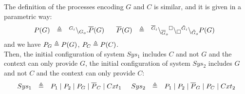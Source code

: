 The definition of the processes encoding $G$ and $C$ is similar, and it is given in a parametric way:
\[
\begin{array}{lcl @{\hspace{0.5cm}}lcl}
P(G) &\defeq&\link{G_i}{G_o}.\overline{P}(G)\   & \overline{P}(G)&\defeq&\link{\overline{G}_i}{\overline{G}_o} \link{\noact}{\noact}\link{\tilde{G}_i}{\tilde{G}_o}P(G) \ \ 			                      
\end{array}
\]
and we have $P_G \triangleq P(G)$, $P_C \triangleq P(C)$.\\
Then, the initial configuration of system $Sys_1$ includes $C$ and not $G$ and the context can only provide $G$,
the initial configuration of system $Sys_2$ includes $G$ and not $C$ and the context can only provide $C$:
\[
\begin{array}{lcl@{\hspace{0.5cm}}lcl}
Sys_1 & \defeq & P_1 \mid P_2 \mid P_G \mid \overline{P}_C \mid Cxt_1 &
Sys_2 & \defeq & P_1 \mid P_2 \mid \overline{P}_G \mid P_C \mid Cxt_2\\
\end{array}
\]




